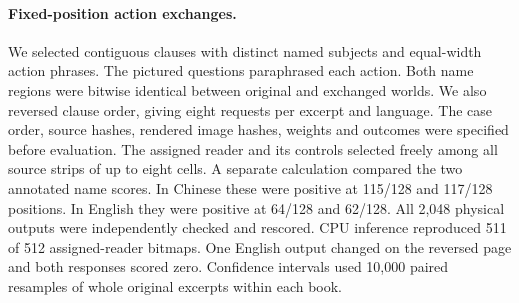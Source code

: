 \paragraph{Fixed-position action exchanges.}
We selected contiguous clauses with distinct named subjects and equal-width action phrases. The pictured questions paraphrased each action. Both name regions were bitwise identical between original and exchanged worlds. We also reversed clause order, giving eight requests per excerpt and language. The case order, source hashes, rendered image hashes, weights and outcomes were specified before evaluation. The assigned reader and its controls selected freely among all source strips of up to eight cells. A separate calculation compared the two annotated name scores. In Chinese these were positive at 115/128 and 117/128 positions. In English they were positive at 64/128 and 62/128. All 2,048 physical outputs were independently checked and rescored. CPU inference reproduced 511 of 512 assigned-reader bitmaps. One English output changed on the reversed page and both responses scored zero. Confidence intervals used 10,000 paired resamples of whole original excerpts within each book.
